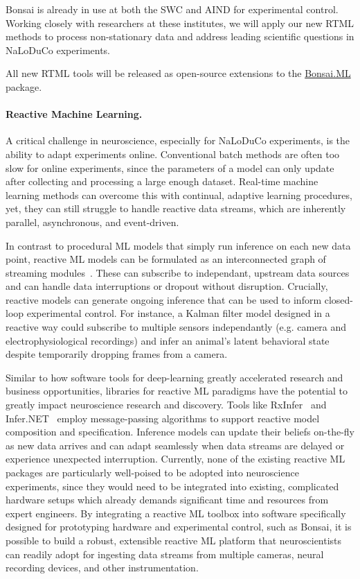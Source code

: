 Bonsai is already in use at both the SWC and AIND for experimental control. Working closely with researchers at these institutes, we will apply our new RTML methods to process non-stationary data and address leading scientific questions in NaLoDuCo experiments.

All new RTML tools will be released as open-source extensions to the \href{https://bonsai-rx.org/machinelearning/}{Bonsai.ML} package.

\paragraph{Reactive Machine Learning.}

A critical challenge in neuroscience, especially for NaLoDuCo experiments, is the ability to adapt experiments online. Conventional batch methods are often too slow for online experiments, since the parameters of a model can only update after collecting and processing a large enough dataset. Real-time machine learning methods can overcome this with continual, adaptive learning procedures, yet, they can still struggle to handle reactive data streams, which are inherently parallel, asynchronous, and event-driven.

In contrast to procedural ML models that simply run inference on each new data point, reactive ML models can be formulated as an interconnected graph of streaming modules~\cite{bertDeVries}. These can subscribe to independant, upstream data sources and can handle data interruptions or dropout without disruption. Crucially, reactive models can generate ongoing inference that can be used to inform closed-loop experimental control. For instance, a Kalman filter model designed in a reactive way could subscribe to multiple sensors independantly (e.g. camera and electrophysiological recordings) and infer an animal’s latent behavioral state despite temporarily dropping frames from a camera.

Similar to how software tools for deep-learning greatly accelerated research and business opportunities, libraries for reactive ML paradigms have the potential to greatly impact neuroscience research and discovery. Tools like RxInfer~\citep{RxInfer} and Infer.NET~\citep{Infer.NET} employ message-passing algorithms to support reactive model composition and specification. Inference models can update their beliefs on-the-fly as new data arrives and can adapt seamlessly when data streams are delayed or experience unexpected interruption. Currently, none of the existing reactive ML packages are particularly well-poised to be adopted into neuroscience experiments, since they would need to be integrated into existing, complicated hardware setups which already demands significant time and resources from expert engineers. By integrating a reactive ML toolbox into software specifically designed for prototyping hardware and experimental control, such as Bonsai, it is possible to build a robust, extensible reactive ML platform that neuroscientists can readily adopt for ingesting data streams from multiple cameras, neural recording devices, and other instrumentation. 

